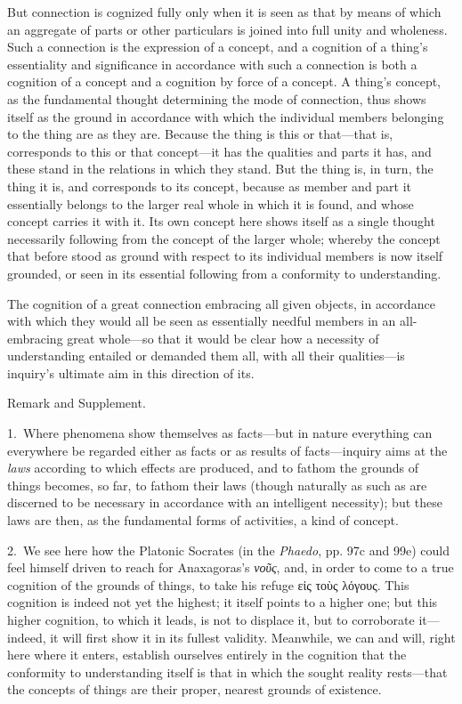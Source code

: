 \documentclass[12pt,a4paper]{book}
\begin{document}
But connection is cognized fully only when it is seen as that by means of which an
aggregate of parts or other particulars is joined into full unity and wholeness.
Such a connection is the expression of a concept, and a cognition of a thing's
essentiality and significance in accordance with such a connection is both a
cognition of a concept and a cognition by force of a concept. A thing's concept,
as the fundamental thought determining the mode of connection, thus shows itself
as the ground in accordance with which the individual members belonging to the
thing are as they are. Because the thing is this or that---that is, corresponds to
this or that concept---it has the qualities and parts it has, and these stand in
the relations in which they stand. But the thing is, in turn, the thing it is, and
corresponds to its concept, because as member and part it essentially belongs to
the larger real whole in which it is found, and whose concept carries it with it.
Its own concept here shows itself as a single thought necessarily following from
the concept of the larger whole; whereby the concept that before stood as ground
with respect to its individual members is now itself grounded, or seen in its
essential following from a conformity to understanding.

The cognition of a great connection embracing all given objects, in accordance
with which they would all be seen as essentially needful members in an
all-embracing great whole---so that it would be clear how a necessity of
understanding entailed or demanded them all, with all their qualities---is
inquiry's ultimate aim in this direction of its.

\begin{center}Remark and Supplement.\end{center}
1.~Where phenomena show themselves as facts---but in nature everything can
everywhere be regarded either as facts or as results of facts---inquiry aims at the
\emph{laws} according to which effects are produced, and to fathom the grounds of
things becomes, so far, to fathom their laws (though naturally as such as are
discerned to be necessary in accordance with an intelligent necessity); but these
laws are then, as the fundamental forms of activities, a kind of concept.

2.~We see here how the Platonic Socrates (in the \textit{Phaedo}, pp. 97c and 99e)
could feel himself driven to reach for Anaxagoras's \emph{νοῦς}, and, in order to come to
a true cognition of the grounds of things, to take his refuge εἰς τοὺς λόγους.
This cognition is indeed not yet the highest; it itself points to a higher one;
but this higher cognition, to which it leads, is not to displace it, but to
corroborate it---indeed, it will first show it in its fullest validity. Meanwhile,
we can and will, right here where it enters, establish ourselves entirely in the
cognition that the conformity to understanding itself is that in which the sought
reality rests---that the concepts of things are their proper, nearest grounds of
existence.
\end{document}
